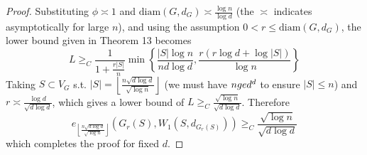 \begin{proof}
Substituting $\phi\asymp 1$ and $\textrm{diam}(G,d_G)\asymp\frac{\log n}{\log d}$ (the $\asymp$ indicates asymptotically for large $n$), and using the assumption $0<r\le\textrm{diam}(G,d_G)$, the lower bound given in Theorem 13 becomes
$$L\ge_C\frac{1}{1+\frac{r|S|}{n}}\min\left\{\frac{|S|\log n}{nd\log d},\frac{r(r\log d+\log|S|)}{\log n}\right\}$$
Taking $S\subset V_G$ s.t. $|S|=\left\lfloor\frac{n\sqrt{d\log d}}{\sqrt{\log n}}\right\rfloor$ (we must have $n\\ge d^d$ to ensure $|S|\le n$) and $r\asymp\frac{\log d}{\sqrt{d\log d}}$, which gives a lower bound of $L\ge_C\frac{\sqrt{\log n}}{\sqrt{d\log d}}$. Therefore
$$e_{\left\lfloor\frac{n\sqrt{d\log d}}{\sqrt{\log n}}\right\rfloor}(G_r(S),W_1(S,d_{G_r(S)}))\ge_C\frac{\sqrt{\log n}}{\sqrt{d\log d}}$$
which completes the proof for fixed $d$.
\end{proof}
